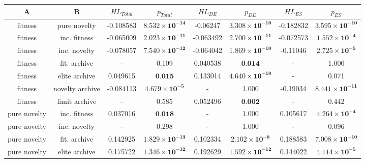 \begin{tabular}{cccccccc}
\toprule
              A &               B & ${HL}_{Total}$ &                      $p_{Total}$ & ${HL}_{DE}$ &                         $p_{DE}$ & ${HL}_{ES}$ &                         $p_{ES}$ \\
\midrule
        fitness &    pure novelty &      -0.108583 & $\mathbf{8.532 \times 10^{-14}}$ &    -0.06247 & $\mathbf{3.308 \times 10^{-10}}$ &   -0.182832 & $\mathbf{3.595 \times 10^{-10}}$ \\
        fitness &    inc. fitness &      -0.065009 & $\mathbf{2.023 \times 10^{-11}}$ &   -0.063492 & $\mathbf{2.700 \times 10^{-11}}$ &   -0.072573 &  $\mathbf{1.552 \times 10^{-4}}$ \\
        fitness &    inc. novelty &      -0.078057 & $\mathbf{7.540 \times 10^{-12}}$ &   -0.064042 & $\mathbf{1.869 \times 10^{-10}}$ &    -0.11046 &  $\mathbf{2.725 \times 10^{-5}}$ \\
        fitness &    fit. archive &              - &                            0.109 &    0.040538 &                 $\textbf{0.014}$ &           - &                            1.000 \\
        fitness &   elite archive &       0.049615 &                 $\textbf{0.015}$ &    0.133014 & $\mathbf{4.640 \times 10^{-10}}$ &           - &                            0.071 \\
        fitness & novelty archive &      -0.084113 &  $\mathbf{4.679 \times 10^{-5}}$ &           - &                            1.000 &    -0.19034 & $\mathbf{8.441 \times 10^{-11}}$ \\
        fitness &   limit archive &              - &                            0.585 &    0.052496 &                 $\textbf{0.002}$ &           - &                            0.442 \\
   pure novelty &    inc. fitness &       0.037016 &                 $\textbf{0.018}$ &           - &                            1.000 &    0.105617 &  $\mathbf{4.264 \times 10^{-4}}$ \\
   pure novelty &    inc. novelty &              - &                            0.298 &           - &                            1.000 &           - &                            0.096 \\
   pure novelty &    fit. archive &       0.142925 & $\mathbf{1.829 \times 10^{-13}}$ &    0.102334 &  $\mathbf{2.102 \times 10^{-8}}$ &    0.188583 & $\mathbf{7.008 \times 10^{-10}}$ \\
   pure novelty &   elite archive &       0.175722 & $\mathbf{1.346 \times 10^{-12}}$ &    0.192629 & $\mathbf{1.592 \times 10^{-12}}$ &    0.144022 &  $\mathbf{4.114 \times 10^{-5}}$ \\

\end{tabular}
